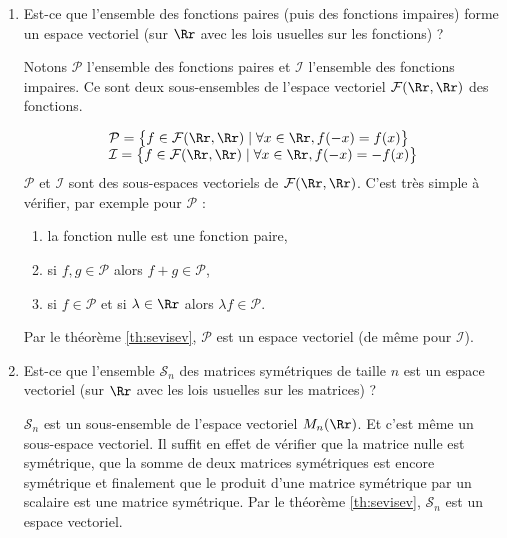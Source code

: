 \documentclass[class=report,crop=false]{standalone}
\begin{document}
\begin{exemple}
\sauteligne
\begin{enumerate}
  \item Est-ce que l'ensemble des fonctions paires (puis des fonctions impaires) forme un espace vectoriel
  (sur $\Rr$ avec les lois usuelles sur les fonctions) ?


  Notons $\mathcal{P}$ l'ensemble des fonctions paires et $\mathcal{I}$ l'ensemble des fonctions
 impaires. Ce sont deux sous-ensembles de l'espace vectoriel $\mathcal{F}(\Rr,\Rr)$ des fonctions.

 $$\begin{array}{l}
 \mathcal{P}=\big\{ f \in \mathcal{F}(\Rr, \Rr ) \mid \forall x \in \Rr , f(-x)=f(x) \big\} \\
 \mathcal{I}=\big\{ f \in \mathcal{F}(\Rr, \Rr ) \mid \forall x \in \Rr , f(-x)=-f(x) \big\}
 \end{array}$$
 $\mathcal{P}$ et $\mathcal{I}$ sont des sous-espaces vectoriels de $\mathcal{F}(\Rr , \Rr)$. C'est très simple à vérifier,
 par exemple pour $\mathcal{P}$ :
  \begin{enumerate}
    \item la fonction nulle est une fonction paire,
    \item si $f,g \in \mathcal{P}$ alors $f+g \in\mathcal{P}$,
    \item si $f\in\mathcal{P}$ et si $\lambda \in \Rr$ alors $\lambda f\in\mathcal{P}$.
  \end{enumerate}
  Par le théorème \ref{th:sevisev}, $\mathcal{P}$ est un espace vectoriel (de même pour $\mathcal{I}$).


  \item Est-ce que l'ensemble $\mathcal{S}_n$ des matrices symétriques de taille $n$ est un espace vectoriel
  (sur $\Rr$ avec les lois usuelles sur les matrices) ?

  $\mathcal{S}_n$ est un sous-ensemble de l'espace vectoriel $M_{n}(\Rr)$.
  Et c'est même un sous-espace vectoriel. Il suffit en effet de vérifier
 que la matrice nulle est symétrique, que la somme de deux matrices
 symétriques est encore symétrique et finalement que le produit
 d'une matrice symétrique par un scalaire est une matrice symétrique.
 Par le théorème \ref{th:sevisev}, $\mathcal{S}_n$ est un espace vectoriel.
\end{enumerate}
\end{exemple}
\end{document}
